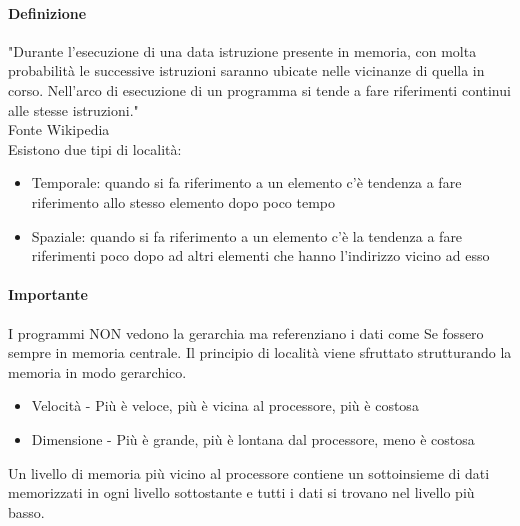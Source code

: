 \documentclass[12pt, a4paper, openany]{book}
\begin{document}
\paragraph*{Definizione} "Durante l'esecuzione di una data istruzione presente in memoria, 
con molta probabilità le successive istruzioni saranno ubicate nelle vicinanze
 di quella in corso.
Nell'arco di esecuzione di un programma si tende a fare riferimenti continui 
alle stesse istruzioni."
\\ Fonte Wikipedia 
\\ Esistono due tipi di località:
\begin{itemize}
    \item Temporale: quando si fa riferimento a un elemento c'è tendenza a fare
    riferimento allo stesso elemento dopo poco tempo
    \item Spaziale: quando si fa riferimento a un elemento c'è la tendenza a fare riferimenti
    poco dopo ad altri elementi che hanno l'indirizzo vicino ad esso
\end{itemize}
\paragraph*{Importante}I programmi NON vedono la gerarchia ma referenziano i dati come Se
fossero sempre in memoria centrale.
Il principio di località viene sfruttato strutturando la memoria in modo gerarchico.
\begin{itemize}
    \item Velocità - Più è veloce, più è vicina al processore, più è costosa
    \item Dimensione - Più è grande, più è lontana dal processore, meno è costosa
\end{itemize}
Un livello di memoria più vicino al processore contiene un sottoinsieme di dati memorizzati in ogni livello sottostante
e tutti i dati si trovano nel livello più basso.
\end{document}
